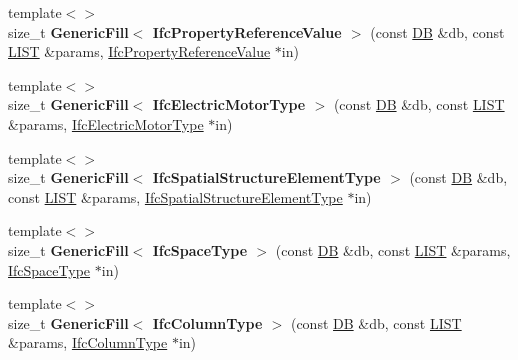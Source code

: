 \begin{DoxyCompactItemize}
\item 
\hypertarget{namespace_assimp_1_1_s_t_e_p_a1d0bf77e8493a2a34153fce6ddde420b}{{\footnotesize template$<$$>$ }\\size\+\_\+t {\bfseries Generic\+Fill$<$ Ifc\+Property\+Reference\+Value $>$} (const \hyperlink{class_assimp_1_1_s_t_e_p_1_1_d_b}{D\+B} \&db, const \hyperlink{class_assimp_1_1_s_t_e_p_1_1_e_x_p_r_e_s_s_1_1_l_i_s_t}{L\+I\+S\+T} \&params, \hyperlink{struct_assimp_1_1_i_f_c_1_1_ifc_property_reference_value}{Ifc\+Property\+Reference\+Value} $\ast$in)}\label{namespace_assimp_1_1_s_t_e_p_a1d0bf77e8493a2a34153fce6ddde420b}

\item 
\hypertarget{namespace_assimp_1_1_s_t_e_p_aab7e1a7ef1c500a82b6ed757cd954506}{{\footnotesize template$<$$>$ }\\size\+\_\+t {\bfseries Generic\+Fill$<$ Ifc\+Electric\+Motor\+Type $>$} (const \hyperlink{class_assimp_1_1_s_t_e_p_1_1_d_b}{D\+B} \&db, const \hyperlink{class_assimp_1_1_s_t_e_p_1_1_e_x_p_r_e_s_s_1_1_l_i_s_t}{L\+I\+S\+T} \&params, \hyperlink{struct_assimp_1_1_i_f_c_1_1_ifc_electric_motor_type}{Ifc\+Electric\+Motor\+Type} $\ast$in)}\label{namespace_assimp_1_1_s_t_e_p_aab7e1a7ef1c500a82b6ed757cd954506}

\item 
\hypertarget{namespace_assimp_1_1_s_t_e_p_a921317461c9081c329c3630110183867}{{\footnotesize template$<$$>$ }\\size\+\_\+t {\bfseries Generic\+Fill$<$ Ifc\+Spatial\+Structure\+Element\+Type $>$} (const \hyperlink{class_assimp_1_1_s_t_e_p_1_1_d_b}{D\+B} \&db, const \hyperlink{class_assimp_1_1_s_t_e_p_1_1_e_x_p_r_e_s_s_1_1_l_i_s_t}{L\+I\+S\+T} \&params, \hyperlink{struct_assimp_1_1_i_f_c_1_1_ifc_spatial_structure_element_type}{Ifc\+Spatial\+Structure\+Element\+Type} $\ast$in)}\label{namespace_assimp_1_1_s_t_e_p_a921317461c9081c329c3630110183867}

\item 
\hypertarget{namespace_assimp_1_1_s_t_e_p_a72ef906b58df90c33f93854fc91275f7}{{\footnotesize template$<$$>$ }\\size\+\_\+t {\bfseries Generic\+Fill$<$ Ifc\+Space\+Type $>$} (const \hyperlink{class_assimp_1_1_s_t_e_p_1_1_d_b}{D\+B} \&db, const \hyperlink{class_assimp_1_1_s_t_e_p_1_1_e_x_p_r_e_s_s_1_1_l_i_s_t}{L\+I\+S\+T} \&params, \hyperlink{struct_assimp_1_1_i_f_c_1_1_ifc_space_type}{Ifc\+Space\+Type} $\ast$in)}\label{namespace_assimp_1_1_s_t_e_p_a72ef906b58df90c33f93854fc91275f7}

\item 
\hypertarget{namespace_assimp_1_1_s_t_e_p_ab1ebe69ad49297fd7fb1626dfda9c994}{{\footnotesize template$<$$>$ }\\size\+\_\+t {\bfseries Generic\+Fill$<$ Ifc\+Column\+Type $>$} (const \hyperlink{class_assimp_1_1_s_t_e_p_1_1_d_b}{D\+B} \&db, const \hyperlink{class_assimp_1_1_s_t_e_p_1_1_e_x_p_r_e_s_s_1_1_l_i_s_t}{L\+I\+S\+T} \&params, \hyperlink{struct_assimp_1_1_i_f_c_1_1_ifc_column_type}{Ifc\+Column\+Type} $\ast$in)}\label{namespace_assimp_1_1_s_t_e_p_ab1ebe69ad49297fd7fb1626dfda9c994}


\end{DoxyCompactItemize}
